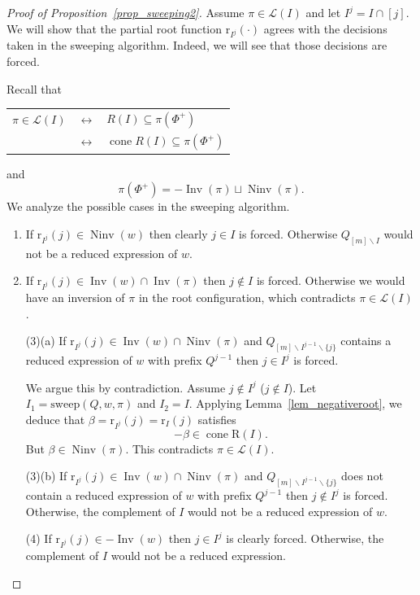 \documentclass{amsart}
\theoremstyle{definition}
\DeclareMathOperator{\cone}{cone} %
\DeclareMathOperator{\Inv}{Inv} %
\DeclareMathOperator{\Ninv}{Ninv} %
\newcommand{\linearExtensions}{\mathcal{L}} %
\newcommand{\Roots}{\mathrm{R}} %
\newcommand{\rootFunction}[2]{\mathrm{r}_{#1}(#2)} %
\newcommand{\sweepingAlgorithm}{\mathrm{sweep}} %
\begin{document}
\begin{proof}[Proof of Proposition~\ref{prop_sweeping2}]
Assume $\pi \in \linearExtensions(I)$ and let $I^j=I\cap [j]$. 
We will show that the partial root function $\rootFunction{I^j}{\cdot}$ agrees with the decisions taken in the sweeping algorithm. Indeed, we will see that those decisions are forced. 

Recall that 

\begin{center}
\begin{tabular}{ccl}
    $\pi \in \linearExtensions(I)$ & $\longleftrightarrow$ & $R(I)\subseteq \pi(\Phi^+)$\\
     & $\longleftrightarrow$ & $\cone R(I)\subseteq \pi(\Phi^+)$
\end{tabular}    
\end{center}
and 
\[
\pi(\Phi^+) = -\Inv(\pi) \sqcup \Ninv(\pi).
\]
We analyze the possible cases in the sweeping algorithm. 

\begin{enumerate}
    \item If $\rootFunction{I^j}{j}\in \Ninv(w)$ then clearly $j\in I$ is forced. Otherwise $Q_{[m]\smallsetminus I}$ would not be a reduced expression of $w$.
    \item If $\rootFunction{I^j}{j}\in \Inv(w) \cap \Inv (\pi)$ then $j\notin I$ is forced. 
    Otherwise we would have an inversion of $\pi$ in the root configuration, which contradicts $\pi \in \linearExtensions(I)$.
    \item[(3)(a)] If $\rootFunction{I^j}{j}\in \Inv(w) \cap \Ninv (\pi)$ and $Q_{[m]\smallsetminus I^{j-1}\smallsetminus \{j\}}$ contains a reduced expression of $w$ with prefix $Q^{j-1}$ then $j\in I^j$ is forced. 

    We argue this by contradiction. 
    Assume $j\notin I^j$ ($j\notin I$). Let $I_1=\sweepingAlgorithm(Q,w,\pi)$ and $I_2=I$. Applying Lemma~\ref{lem_negativeroot}, we deduce that $\beta=\rootFunction{I^j}{j}=\rootFunction{I}{j}$ satisfies 
    \[
    -\beta \in \cone \Roots(I).
    \]
    But $\beta \in \Ninv(\pi)$. This contradicts $\pi\in \linearExtensions(I)$.
    \item[(3)(b)]  If $\rootFunction{I^j}{j}\in \Inv(w) \cap \Ninv (\pi)$ and $Q_{[m]\smallsetminus I^{j-1}\smallsetminus \{j\}}$ does not contain a reduced expression of $w$ with prefix $Q^{j-1}$ then $j\notin I^j$ is forced. Otherwise, the complement of $I$ would not be a reduced expression of $w$.
    \item[(4)] If $\rootFunction{I^j}{j}\in -\Inv(w)$ then $j\in I^j$ is clearly forced. Otherwise, the complement of $I$ would not be a reduced expression.
\end{enumerate}
\end{proof}
\end{document}
